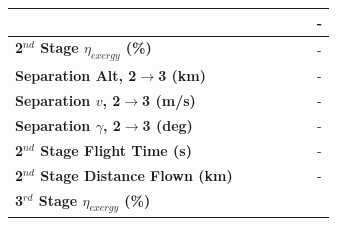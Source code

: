 \begin{table}[ht]
\begin{tabular}{l c c c c c c}
		& \firstsecondSeparationgammaISPThreeNinetyNoReturn
		& \firstsecondSeparationgammaISPThreeNinetyFiveNoReturn
		& \firstsecondSeparationgammaISPThreeStandardNoReturn
		& \firstsecondSeparationgammaISPThreeOneHundredFiveNoReturn
		& \firstsecondSeparationgammaISPThreeOneHundredTenNoReturn
		& -
		\\
		\hline 
		\textbf{2$^{nd}$ Stage $\eta_{exergy}$ (\%)}
		& \textbf{\secondExergyEffISPThreeNinetyNoReturn}
		& \textbf{\secondExergyEffISPThreeNinetyFiveNoReturn}
		& \textbf{\secondExergyEffISPThreeStandardNoReturn}
		& \textbf{\secondExergyEffISPThreeOneHundredFiveNoReturn}
		& \textbf{\secondExergyEffISPThreeOneHundredTenNoReturn}
		& -
		\\
		\textbf{Separation Alt, 2$\rightarrow$3 (km)}
		& \secondthirdSeparationAltISPThreeNinetyNoReturn
		& \secondthirdSeparationAltISPThreeNinetyFiveNoReturn
		& \secondthirdSeparationAltISPThreeStandardNoReturn
		& \secondthirdSeparationAltISPThreeOneHundredFiveNoReturn
		& \secondthirdSeparationAltISPThreeOneHundredTenNoReturn
		& -
		\\
		\textbf{Separation $v$, 2$\rightarrow$3 (m/s)}
		& \secondthirdSeparationvISPThreeNinetyNoReturn
		& \secondthirdSeparationvISPThreeNinetyFiveNoReturn
		& \secondthirdSeparationvISPThreeStandardNoReturn
		& \secondthirdSeparationvISPThreeOneHundredFiveNoReturn
		& \secondthirdSeparationvISPThreeOneHundredTenNoReturn
		& -
		\\
		\textbf{Separation $\gamma$, 2$\rightarrow$3 (deg)}
		& \secondthirdSeparationgammaISPThreeNinetyNoReturn
		& \secondthirdSeparationgammaISPThreeNinetyFiveNoReturn
		& \secondthirdSeparationgammaISPThreeStandardNoReturn
		& \secondthirdSeparationgammaISPThreeOneHundredFiveNoReturn
		& \secondthirdSeparationgammaISPThreeOneHundredTenNoReturn
		& -
		\\
		\textbf{2$^{nd}$ Stage Flight Time (s)}
		& \secondFlightTimeISPThreeNinetyNoReturn
		& \secondFlightTimeISPThreeNinetyFiveNoReturn
		& \secondFlightTimeISPThreeStandardNoReturn
		& \secondFlightTimeISPThreeOneHundredFiveNoReturn
		& \secondFlightTimeISPThreeOneHundredTenNoReturn
		& -
		\\
		\textbf{2$^{nd}$ Stage Distance Flown (km)}
		& \SecondDistISPThreeNinetyNoReturn
		& \SecondDistISPThreeNinetyFiveNoReturn
		& \SecondDistISPThreeStandardNoReturn
		& \SecondDistISPThreeOneHundredFiveNoReturn
		& \SecondDistISPThreeOneHundredTenNoReturn
		& -
		\\
		\hline 
		\textbf{3$^{rd}$ Stage $\eta_{exergy}$ (\%)}
		& \textbf{\thirddExergyEffISPThreeNinetyNoReturn}

\end{tabular}
\end{table}
